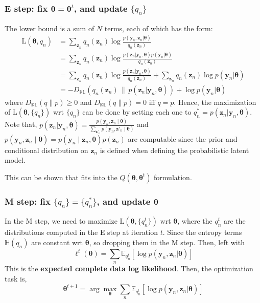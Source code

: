 \documentclass[11pt]{article}
\begin{document}
\subsubsection*{E step: fix $\boldsymbol{\theta} = \boldsymbol{\theta}^t $, and update $\{q_n\}$}
The lower bound is a sum of $N$ terms, each of which has the form:
\[
\begin{aligned}
\text{L}(\boldsymbol{\theta}, q_n) &= \sum_{\boldsymbol{z}_n} q_n(\boldsymbol{z}_n) \log \frac{p(\boldsymbol{y}_n, \boldsymbol{z}_n | \boldsymbol{\theta})}{q_n(\boldsymbol{z}_n)} \\
&= \sum_{\boldsymbol{z}_n} q_n(\boldsymbol{z}_n) \log \frac{p(\boldsymbol{z}_n | \boldsymbol{y}_n, \boldsymbol{\theta}) p(\boldsymbol{y}_n | \boldsymbol{\theta})}{q_n(\boldsymbol{z}_n)} \\
&= \sum_{\boldsymbol{z}_n} q_n(\boldsymbol{z}_n) \log \frac{p(\boldsymbol{z}_n | \boldsymbol{y}_n, \boldsymbol{\theta})}{q_n(\boldsymbol{z}_n)} + \sum_{\boldsymbol{z}_n} q_n(\boldsymbol{z}_n) \log p(\boldsymbol{y}_n | \boldsymbol{\theta}) \\
&= -D_{\mathbb{KL}} \left( q_n(\boldsymbol{z}_n) \, \| \, p(\boldsymbol{z}_n | \boldsymbol{y}_n, \boldsymbol{\theta}) \right) + \log p(\boldsymbol{y}_n | \boldsymbol{\theta})
\end{aligned}
\]
where $D_{\mathbb{KL}}(q \| p) \geq 0$ and $D_{\mathbb{KL}}(q \| p) = 0$ iff $q = p$.
Hence, the maximization of $\text{L}(\boldsymbol{\theta}, \{q_n\})$ wrt $\{q_n\}$ can be done by setting each one to $q_n^* = p(\boldsymbol{z}_n | \boldsymbol{y}_n, \boldsymbol{\theta})$.
Note that, $p(\boldsymbol{z}_n | \boldsymbol{y}_n, \boldsymbol{\theta}) = \frac{p(\boldsymbol{y}_n, \boldsymbol{z}_n \mid \boldsymbol{\theta})}{\sum_{\boldsymbol{z}'_n} p(\boldsymbol{y}_n, \boldsymbol{z}'_n \mid \boldsymbol{\theta})}$ 
and $p(\boldsymbol{y}_n, \boldsymbol{z}_n \mid \boldsymbol{\theta}) = p(\boldsymbol{y}_n \mid \boldsymbol{z}_n , \boldsymbol{\theta})p(\boldsymbol{z}_n)$ are computable since the prior and conditional distribution on $\boldsymbol{z}_n$ is defined when defining the probabilistic latent model.

This can be shown that fits into the $Q(\boldsymbol{\theta}, \boldsymbol{\theta}^{t})$ formulation.

\subsubsection*{M step: fix $\{q_n\} = \{q_n^*\}$, and update $\boldsymbol{\theta}$}
In the M step, we need to maximize $\text{L}(\boldsymbol{\theta}, \{q_n^t\})$ wrt $\boldsymbol{\theta}$, where the $q_n^t$ are the distributions computed in the E step at iteration $t$. Since the entropy terms $\mathbb{H}(q_n)$ are constant wrt $\boldsymbol{\theta}$, so dropping them in the M step. Then, left with
\[
\ell^t(\boldsymbol{\theta}) = \sum_n \mathbb{E}_{q_n^t} \left[ \log p(\boldsymbol{y}_n, \boldsymbol{z}_n | \boldsymbol{\theta}) \right]
\]
This is the \textbf{expected complete data log likelihood}. Then, the optimization task is,
\[
\boldsymbol{\theta}^{t+1} = \arg\max_{\boldsymbol{\theta}} \sum_n \mathbb{E}_{q_n^t} \left[ \log p(\boldsymbol{y}_n, \boldsymbol{z}_n | \boldsymbol{\theta}) \right]
\]
\end{document}

